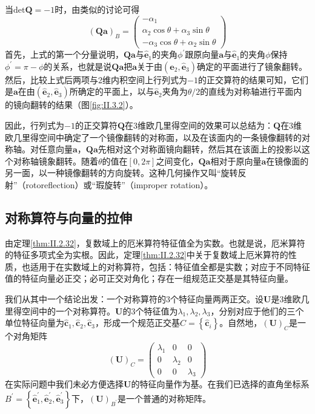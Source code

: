 \documentclass[../main.tex]{subfiles}
\begin{document}
当$\mathrm{det}\mathbf{Q}=-1$时，由类似的讨论可得
\[\left(\mathbf{Qa}\right)_B=\left(\begin{array}{c}-\alpha_1\\\alpha_2\cos\theta+\alpha_3\sin\theta\\-\alpha_3\cos\theta+\alpha_2\sin\theta\end{array}\right)\]
首先，上式的第一个分量说明，$\mathbf{Qa}$与$\mathbf{\hat{e}}_1$的夹角$\phi^\prime$跟原向量$\mathbf{a}$与$\mathbf{\hat{e}}_1$的夹角$\phi$保持$\phi^\prime=\pi-\phi$的关系，也就是说$\mathbf{Qa}$把$\mathbf{a}$关于由$\left(\mathbf{\hat{e}}_2,\mathbf{\hat{e}}_3\right)$确定的平面进行了镜象翻转。然后，比较上式后两项与2维内积空间上行列式为$-1$的正交算符的结果可知，它们是$\mathbf{a}$在由$\left(\mathbf{\hat{e}}_2,\mathbf{\hat{e}}_3\right)$所确定的平面上，以与$\mathbf{\hat{e}}_2$夹角为$\theta/2$的直线为对称轴进行平面内的镜向翻转的结果（图\ref{fig:II.3.2}）。

因此，行列式为$-1$的正交算符$\mathbf{Q}$在3维欧几里得空间的效果可以总结为：$\mathbf{Q}$在3维欧几里得空间中确定了一个镜像翻转的对称面，以及在该面内的一条镜像翻转的对称轴。对任意向量$\mathbf{a}$，$\mathbf{Qa}$先相对这个对称面镜向翻转，然后其在该面上的投影以这个对称轴镜象翻转。随着$\theta$的值在$\left[0,2\pi\right]$之间变化，$\mathbf{Qa}$相对于原向量$\mathbf{a}$在镜像面的另一面，以一种镜像翻转的方向旋转。这种几何操作又叫“旋转反射”（rotoreflection）或“瑕旋转”（improper rotation）。

\subsection{对称算符与向量的拉伸}\label{sec:II.3.3.2}
由定理\ref{thm:II.2.32}，复数域上的厄米算符特征值全为实数。也就是说，厄米算符的特征多项式全为实根。因此，定理\ref{thm:II.2.32}中关于复数域上厄米算符的性质，也适用于在实数域上的对称算符，包括：特征值全都是实数\cite[\S 5.3 定理3.4]{周胜林2012线性代数}；对应于不同特征值的特征向量必正交\cite[\S 5.3 定理3.5]{周胜林2012线性代数}；必可正交对角化\cite[\S 5.3 定理3.6]{周胜林2012线性代数}；存在一组规范正交基是其特征向量。

我们从其中一个结论出发：一个对称算符的3个特征向量两两正交。设$\mathbf{U}$是3维欧几里得空间中的一个对称算符。$\mathbf{U}$的3个特征值为$\lambda_1,\lambda_2,\lambda_3$，分别对应于他们的三个单位特征向量为$\mathbf{\hat{c}}_1,\mathbf{\hat{c}}_2,\mathbf{\hat{c}}_3$，形成一个规范正交基$C=\left\{\mathbf{\hat{c}}_i\right\}$。自然地，$\left(\mathbf{U}\right)_C$是一个对角矩阵
\[
    \left(\mathbf{U}\right)_C=\left(\begin{array}{ccc}\lambda_1&0&0\\0&\lambda_2&0\\0&0&\lambda_3\end{array}\right)
\]
在实际问题中我们未必方便选择$\mathbf{U}$的特征向量作为基。在我们已选择的直角坐标系$B^\prime=\left\{\mathbf{\hat{e}}^\prime_1,\mathbf{\hat{e}}^\prime_2,\mathbf{\hat{e}}^\prime_3\right\}$下，$\left(\mathbf{U}\right)_{B^\prime}$是一个普通的对称矩阵。
\end{document}
